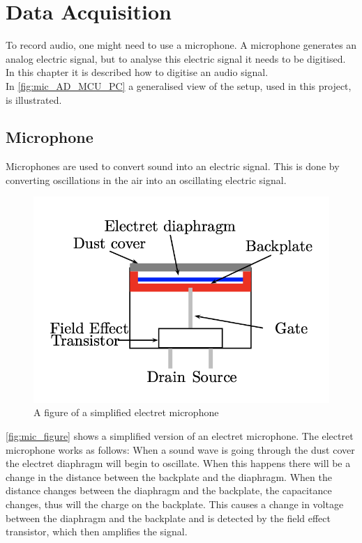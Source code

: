 \chapter{Data Acquisition}
To record audio, one might need to use a microphone. A microphone generates an analog electric signal, but to analyse this electric signal it needs to be digitised. In this chapter it is described how to digitise an audio signal.\\
In \autoref{fig:mic_AD_MCU_PC} a generalised view of the setup, used in this project, is illustrated.




\section{Microphone}
Microphones are used to convert sound into an electric signal. This is done by converting oscillations in the air into an oscillating electric signal. 

\begin{figure}[H]
    \centering
    \includegraphics[scale=0.65]{figures/Microphone_figure.png}
    \caption{A figure of a simplified electret microphone \cite[p. 160]{LectureNotes}}
    \label{fig:mic_figure}
\end{figure}

\autoref{fig:mic_figure} shows a simplified version of an electret microphone. The electret microphone works as follows: When a sound wave is going through the dust cover the electret diaphragm will begin to oscillate. When this happens there will be a change in the distance between the backplate and the diaphragm. When the distance changes between the diaphragm and the backplate, the capacitance changes, thus will the charge on the backplate. This causes a change in voltage between the diaphragm and the backplate and is detected by the field effect transistor, which then amplifies the signal. 


